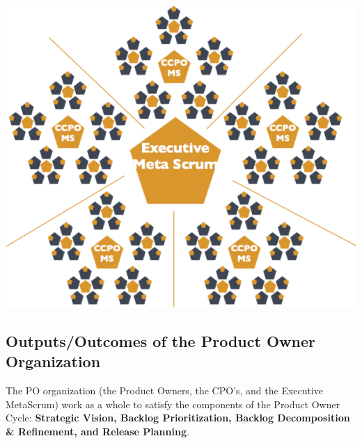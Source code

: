 \documentclass[12pt,a4paper,parskip=full]{scrartcl}
\begin{document}
\includegraphics[width=1.0\linewidth]{ExecMetaScrum.png}

\subsection{Outputs/Outcomes of the Product Owner Organization}
The PO organization (the Product Owners, the CPO's, and the Executive
MetaScrum) work as a whole to satisfy the components of the Product Owner
Cycle: \textbf{Strategic Vision, Backlog Prioritization, Backlog
Decomposition \& Refinement, and Release Planning}.
\end{document}
